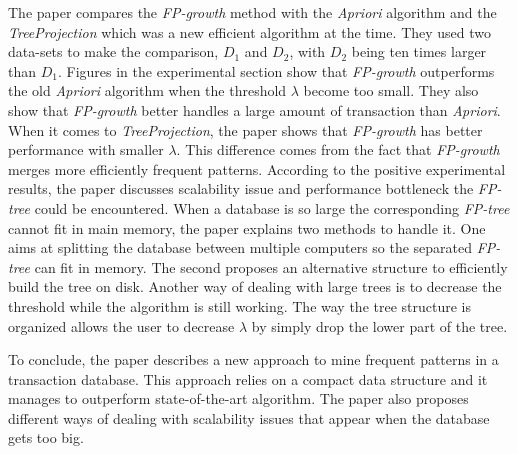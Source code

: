 \documentclass{article}
\begin{document}
The paper compares the \textit{FP-growth} method with the \textit{Apriori} algorithm and the \textit{TreeProjection} which was a new efficient algorithm at the time.
They used two data-sets to make the comparison, $D_1$ and $D_2$, with $D_2$ being ten times larger than $D_1$.
Figures in the experimental section show that \textit{FP-growth} outperforms the old \textit{Apriori} algorithm when the threshold $\lambda$ become too small.
They also show that \textit{FP-growth} better handles a large amount of transaction than \textit{Apriori}.
When it comes to \textit{TreeProjection}, the paper shows that \textit{FP-growth} has better performance with smaller $\lambda$.
This difference comes from the fact that \textit{FP-growth} merges more efficiently frequent patterns.
According to the positive experimental results, the paper discusses scalability issue and performance bottleneck the \textit{FP-tree} could be encountered.
When a database is so large the corresponding \textit{FP-tree} cannot fit in main memory, the paper explains two methods to handle it.
One aims at splitting the database between multiple computers so the separated \textit{FP-tree} can fit in memory.
The second proposes an alternative structure to efficiently build the tree on disk.
Another way of dealing with large trees is to decrease the threshold while the algorithm is still working.
The way the tree structure is organized allows the user to decrease $\lambda$ by simply drop the lower part of the tree. 

To conclude, the paper describes a new approach to mine frequent patterns in a transaction database.
This approach relies on a compact data structure and it manages to outperform state-of-the-art algorithm.
The paper also proposes different ways of dealing with scalability issues that appear when the database gets too big. 
\end{document}
